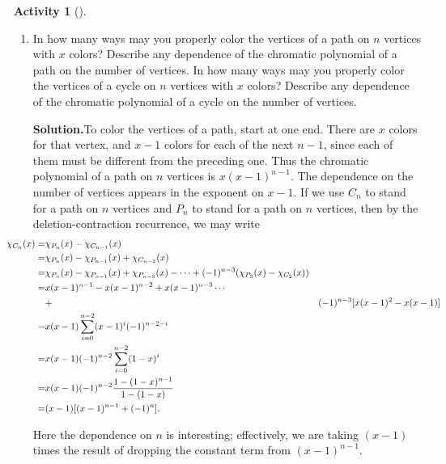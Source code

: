 \documentclass[10pt,]{book}
\theoremstyle{plain}
\theoremstyle{definition}
\newtheorem{activity}[project]{Activity}
\numberwithin{equation}{chapter}
\newcommand{\amp}{&}
\begin{document}
\begin{activity}[]\label{activity-238}
~\par
\begin{enumerate}[label=(\alph*)]
 \item In how many ways may you properly color the vertices of a path on \(n\) vertices with \(x\) colors? Describe any dependence of the chromatic polynomial of a path on the number of vertices. In how many ways may you properly color the vertices of a cycle on \(n\) vertices with \(x\) colors? Describe any dependence of the chromatic polynomial of a cycle on the number of vertices.%
\par\medskip\noindent%
\textbf{Solution.}\quad To color the vertices of a path, start at one end. There are \(x\) colors for that vertex, and \(x-1\) colors for each of the next \(n-1\), since each of them must be different from the preceding one. Thus the chromatic polynomial of a path on \(n\) vertices is \(x(x-1)^{n-1}\). The dependence on the number of vertices appears in the exponent on \(x-1\). If we use \(C_n\) to stand for a path on \(n\) vertices and \(P_n\) to stand for a path on \(n\) vertices, then by the deletion-contraction recurrence, we may write%
\begin{align*}
\hspace{-.4 in}\chi_{C_n}(x)  =\amp
\chi_{P_n}(x)-\chi_{C_{n-1}}(x)\\
=\amp \chi_{P_n}(x)-\chi_{P_{n-1}}(x)+\chi_{C_{n-2}}(x)\\
=\amp
\chi_{P_n}(x)-\chi_{P_{n-1}}(x)+\chi_{P_{n-3}}(x)-
\cdots+(-1)^{n-3}(\chi_{P_3}(x)-\chi_{C_2}(x))\\
=\amp x(x-1)^{n-1}-x(x-1)^{n-2}+x(x-1)^{n-3}\cdots\\
\amp +\amp (-1)^{n-3}[x(x-1)^2-x(x-1)]\\
=\amp x(x-1)\sum_{i=0}^{n-2}(x-1)^i(-1)^{n-2-i}\\
=\amp x(x-1)(-1)^{n-2}\sum_{i=0}^{n-2}(1-x)^i\\
=\amp x(x-1)(-1)^{n-2}\frac{1-(1-x)^{n-1}}{1-(1-x)}\\
=\amp (x-1)[(x-1)^{n-1}+(-1)^n].
\end{align*}
%
\par
Here the dependence on \(n\) is interesting; effectively, we are taking \((x-1)\) times the result of dropping the constant term from \((x-1)^{n-1}\).%


\end{enumerate}
\end{activity}
\end{document}

